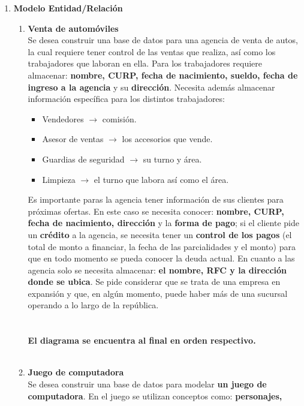 \documentclass{article}
\begin{document}
\begin{enumerate}
\begin{enumerate}
\begin{figure}[H]
				\end{figure}				
			\end{enumerate}
		\item \textbf{Modelo Entidad/Relación}
			\begin{enumerate}
				\item \textbf{Venta de automóviles}
				\\Se desea construir una base de datos para una agencia de venta de autos, la cual requiere tener control de las ventas que realiza, así como los trabajadores que laboran en ella.
				Para los trabajadores requiere almacenar: \textbf{nombre, CURP, fecha de nacimiento, sueldo, fecha de ingreso a la agencia} y su \textbf{dirección}. Necesita además almacenar información específica para los distintos trabajadores:		
				\begin{itemize}
					\item Vendedores $\rightarrow$ comisión.
					\item Asesor de ventas $\rightarrow$ los accesorios que vende.
					\item Guardias de seguridad $\rightarrow$ su turno y área.
					\item Limpieza $\rightarrow$ el turno que labora así como el área.
				\end{itemize}		
			Es importante paras la agencia tener información de sus clientes para próximas ofertas. En este
			caso se necesita conocer: \textbf{nombre, CURP, fecha de nacimiento, dirección} y la \textbf{forma de pago}; si el
			cliente pide un \textbf{crédito} a la agencia, se necesita tener un \textbf{control de los pagos} (el total de monto
			a financiar, la fecha de las parcialidades y el monto) para que en todo momento se pueda
			conocer la deuda actual. En cuanto a las agencia solo se necesita almacenar: \textbf{el nombre, RFC y
			la dirección donde se ubica}. Se pide considerar que se trata de una empresa en expansión y que,
			en algún momento, puede haber más de una sucursal operando a lo largo de la república.
			\\\\\\ \textbf{El diagrama se encuentra al final en orden respectivo.}\\\\		
			\item \textbf{Juego de computadora}
			\\Se desea construir una base de datos para modelar \textbf{un juego de
			computadora}. En el juego se utilizan conceptos como: \textbf{personajes,
}
\end{enumerate}
\end{enumerate}
\end{document}

